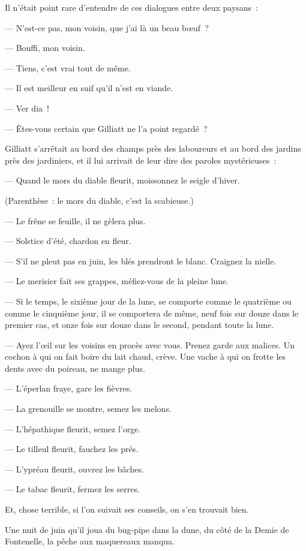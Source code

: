 \documentclass[french,twoside]{book} %
\begin{document}
Il n’était point rare d’entendre de ces dialogues entre deux paysans :\par
— N’est-ce pas, mon voisin, que j’ai là un beau bœuf ?\par
— Bouffi, mon voisin.\par
— Tiens, c’est vrai tout de même.\par
— Il est meilleur en suif qu’il n’est en viande.\par
— Ver dia !\par
— Êtes-vous certain que Gilliatt ne l’a point regardé ?\par
Gilliatt s’arrêtait au bord des champs près des laboureurs et au bord des jardins près des jardiniers, et  il lui arrivait de leur dire des paroles mystérieuses :\par
— Quand le mors du diable fleurit, moissonnez le seigle d’hiver.\par
(Parenthèse : le mors du diable, c’est la scabieuse.)\par
— Le frêne se feuille, il ne gèlera plus.\par
— Solstice d’été, chardon en fleur.\par
— S’il ne pleut pas en juin, les blés prendront le blanc. Craignez la nielle.\par
— Le merisier fait ses grappes, méfiez-vous de la pleine lune.\par
— Si le temps, le sixième jour de la lune, se comporte comme le quatrième ou comme le cinquième jour, il se comportera de même, neuf fois sur douze dans le premier cas, et onze fois sur douze dans le second, pendant toute la lune.\par
— Ayez l’œil sur les voisins en procès avec vous. Prenez garde aux malices. Un cochon à qui on fait boire du lait chaud, crève. Une vache à qui on frotte les dents avec du poireau, ne mange plus.\par
— L’éperlan fraye, gare les fièvres.\par
— La grenouille se montre, semez les melons.\par
— L’hépathique fleurit, semez l’orge.\par
— Le tilleul fleurit, fauchez les prés.\par
— L’ypréau fleurit, ouvrez les bâches.\par
— Le tabac fleurit, fermez les serres.\par
Et, chose terrible, si l’on suivait ses conseils, on s’en trouvait bien.\par
Une nuit de juin qu’il joua du bug-pipe dans la dune, du côté de la Demie de Fontenelle, la pêche aux maquereaux manqua.\par
\end{document}
